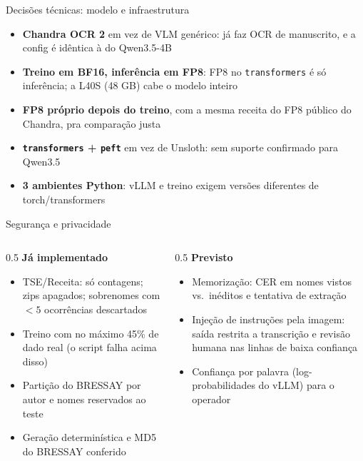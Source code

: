 \documentclass[aspectratio=169,11pt]{beamer}
\begin{document}
\begin{frame}{Decisões técnicas: modelo e infraestrutura}
\begin{itemize}
  \item \textbf{Chandra OCR 2} em vez de VLM genérico: já faz OCR de manuscrito, e a config é idêntica à do Qwen3.5-4B
  \item \textbf{Treino em BF16, inferência em FP8}: FP8 no \texttt{transformers} é só inferência; a L40S (48 GB) cabe o modelo inteiro
  \item \textbf{FP8 próprio depois do treino}, com a mesma receita do FP8 público do Chandra, pra comparação justa
  \item \textbf{\texttt{transformers} + \texttt{peft}} em vez de Unsloth: sem suporte confirmado para Qwen3.5
  \item \textbf{3 ambientes Python}: vLLM e treino exigem versões diferentes de torch/transformers
\end{itemize}
\end{frame}

\begin{frame}{Segurança e privacidade}
\begin{columns}[T]
\begin{column}{0.5\textwidth}
\textbf{Já implementado}
\begin{itemize}
  \item TSE/Receita: só contagens; zips apagados; sobrenomes com $< 5$ ocorrências descartados
  \item Treino com no máximo 45\% de dado real (o script falha acima disso)
  \item Partição do BRESSAY por autor e nomes reservados ao teste
  \item Geração determinística e MD5 do BRESSAY conferido
\end{itemize}
\end{column}
\begin{column}{0.5\textwidth}
\textbf{Previsto}
\begin{itemize}
  \item Memorização: CER em nomes vistos vs.\ inéditos e tentativa de extração
  \item Injeção de instruções pela imagem: saída restrita a transcrição e revisão humana nas linhas de baixa confiança
  \item Confiança por palavra (log-probabilidades do vLLM) para o operador
\end{itemize}
\end{column}
\end{columns}
\end{frame}
\end{document}
